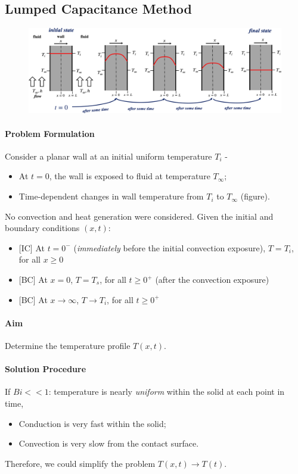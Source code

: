 \documentclass[12pt, a4paper]{article}
\numberwithin{equation}{subsection}
\begin{document}
\subsection{Lumped Capacitance Method}
\begin{figure}[H]
    \centering
    \includegraphics[width=\textwidth]{img/temporal_propagation.eps}
\end{figure}

\paragraph{Problem Formulation} Consider a planar wall at an initial uniform temperature $T_i$ -
\begin{itemize}
    \item At $t = 0$, the wall is exposed to fluid at temperature $T_\infty$;
    \item Time-dependent changes in wall temperature from $T_i$ to $T_\infty$ (figure).
\end{itemize}
No convection and heat generation were considered. 
Given the initial and boundary conditions $(x, t)$:
\begin{itemize}
    \item {\color{gray}[IC]} At $t=0^-$ (\textit{immediately} before the initial convection exposure), $T = T_i$, for all $x \geq 0$
    \item {\color{gray}[BC]} At $x=0$, $T = T_s$, for all $t \geq 0^+$ (after the convection exposure)
    \item {\color{gray}[BC]} At $x \to \infty$, $T \to T_i$, for all $t \geq 0^+$
\end{itemize}

\paragraph{Aim} Determine the temperature profile $T(x, t)$.

\paragraph{Solution Procedure}
If $Bi << 1$: temperature is nearly \textit{uniform} within the solid at each point in time,
\begin{itemize}
    \item Conduction is very fast within the solid;
    \item Convection is very slow from the contact surface.
\end{itemize}
Therefore, we could simplify the problem $T(x, t) \to T(t)$.\\
\end{document}
